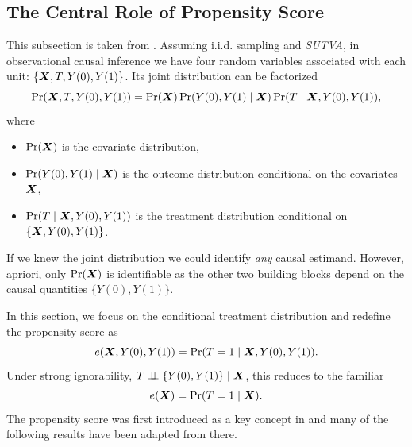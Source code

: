 \documentclass[11pt]{exam}
\begin{document}
\subsection{The Central Role of Propensity Score}
This subsection is taken from \citet[Section~11]{ding2023coursecausalinference}. Assuming i.i.d. sampling and \emph{SUTVA}, in observational causal inference we have four random variables associated with each unit: $\{\bm{X}, T, Y(0), Y(1)\}$. Its joint distribution can be factorized
\[
    \Pr(\bm{X}, T, Y(0), Y(1)) = \Pr(\bm{X}) \Pr(Y(0), Y(1) \mid \bm{X}) \Pr(T \mid \bm{X}, Y(0), Y(1)),
\]
where 
\begin{itemize}
    \item $\Pr(\bm{X})$ is the covariate distribution,
    \item $\Pr(Y(0), Y(1) \mid \bm{X})$ is the outcome distribution conditional on the covariates $\bm{X}$,
    \item $\Pr(T \mid \bm{X}, Y(0), Y(1))$ is the treatment distribution conditional on $\{\bm{X}, Y(0), Y(1)\}$.
\end{itemize}
If we knew the joint distribution we could identify \emph{any} causal estimand. However, apriori, only $\Pr(\bm{X})$ is identifiable as the other two building blocks depend on the causal quantities $\{Y(0), Y(1)\}$.

In this section, we focus on the conditional treatment distribution and redefine the propensity score as
\[
 e(\bm{X}, Y(0), Y(1)) = \Pr(T = 1 \mid \bm{X}, Y(0), Y(1)).
\]
Under strong ignorability, $T \perp\!\!\!\perp \{Y(0), Y(1)\} \mid \bm{X}$, this reduces to the familiar
\[
e(\bm{X}) =  \Pr(T = 1 \mid \bm{X}).
\]
The propensity score was first introduced as a key concept in \citet{rosenbaum1983central} and many of the following results have been adapted from there.
\end{document}
